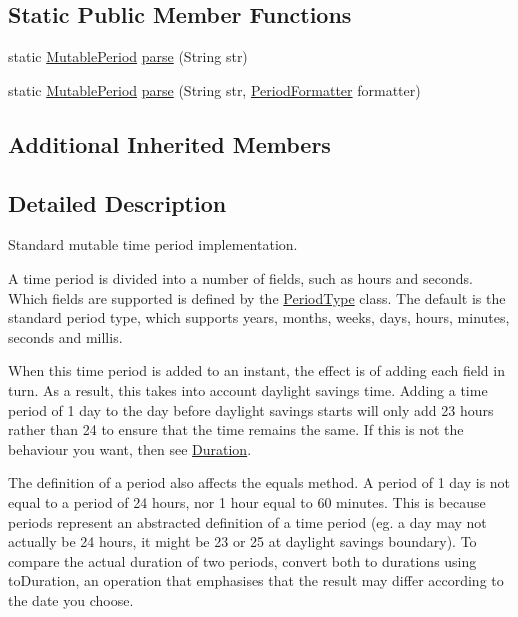 \subsection*{Static Public Member Functions}
\begin{DoxyCompactItemize}
\item 
static \hyperlink{classorg_1_1joda_1_1time_1_1_mutable_period}{Mutable\-Period} \hyperlink{classorg_1_1joda_1_1time_1_1_mutable_period_ae48cce7bab05fa6bc098955d40d4f6c9}{parse} (String str)
\item 
static \hyperlink{classorg_1_1joda_1_1time_1_1_mutable_period}{Mutable\-Period} \hyperlink{classorg_1_1joda_1_1time_1_1_mutable_period_aa7b42b3fea3aab3b4d0ccb82935f955c}{parse} (String str, \hyperlink{classorg_1_1joda_1_1time_1_1format_1_1_period_formatter}{Period\-Formatter} formatter)
\end{DoxyCompactItemize}
\subsection*{Additional Inherited Members}


\subsection{Detailed Description}
Standard mutable time period implementation. 

A time period is divided into a number of fields, such as hours and seconds. Which fields are supported is defined by the \hyperlink{classorg_1_1joda_1_1time_1_1_period_type}{Period\-Type} class. The default is the standard period type, which supports years, months, weeks, days, hours, minutes, seconds and millis. 

When this time period is added to an instant, the effect is of adding each field in turn. As a result, this takes into account daylight savings time. Adding a time period of 1 day to the day before daylight savings starts will only add 23 hours rather than 24 to ensure that the time remains the same. If this is not the behaviour you want, then see \hyperlink{classorg_1_1joda_1_1time_1_1_duration}{Duration}. 

The definition of a period also affects the equals method. A period of 1 day is not equal to a period of 24 hours, nor 1 hour equal to 60 minutes. This is because periods represent an abstracted definition of a time period (eg. a day may not actually be 24 hours, it might be 23 or 25 at daylight savings boundary). To compare the actual duration of two periods, convert both to durations using to\-Duration, an operation that emphasises that the result may differ according to the date you choose. 

